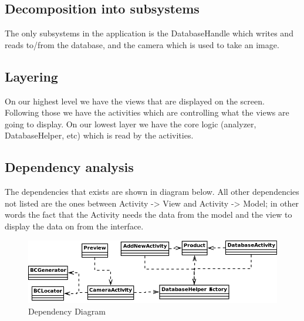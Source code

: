 \documentclass{report}
\begin{document}
\subsection{Decomposition into subsystems}
The only subsystems in the application is the DatabaseHandle which writes and reads to/from the database, and the camera which is used to take an image. 

\subsection{Layering}
On our highest level we have the views that are displayed on the screen. Following those we have the activities which are controlling what the views are going to display. On our lowest layer we have the core logic (analyzer, DatabaseHelper, etc) which is read by the activities.

\subsection{Dependency analysis}
The dependencies that exists are shown in diagram below. All other dependencies not listed are the ones between Activity -> View and Activity -> Model; in other words the fact that the Activity needs the data from the model and the view to display the data on from the interface.

\begin{figure}[H]
		\centering
		\includegraphics[width=\textwidth]{dependencydiagram.png}
		\caption{Dependency Diagram}
		\label{fig:Dependency Diagram}
\end{figure}
\end{document}
